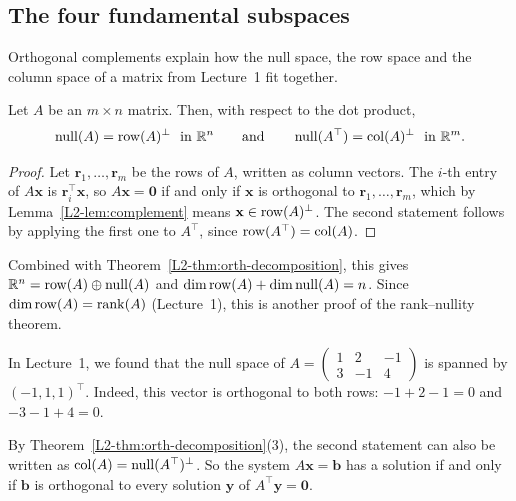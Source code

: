 \subsection{The four fundamental subspaces}

Orthogonal complements explain how the null space, the row space and the column space of a matrix from Lecture~1 fit together.

\begin{theorem}\label{L2-thm:fundamental-subspaces}
    Let $A$ be an $m \times n$ matrix. Then, with respect to the dot product,
    \[\Null(A) = \row(A)^\perp \ \text{ in } \mathbb{R}^n \qquad \text{and} \qquad \Null(A^\top) = \col(A)^\perp \ \text{ in } \mathbb{R}^m.\]
\end{theorem}

\begin{proof}
    Let $\mathbf{r}_1, \ldots, \mathbf{r}_m$ be the rows of $A$, written as column vectors. The $i$-th entry of $A\mathbf{x}$ is $\mathbf{r}_i^\top \mathbf{x}$, so $A\mathbf{x} = \mathbf{0}$ if and only if $\mathbf{x}$ is orthogonal to $\mathbf{r}_1, \ldots, \mathbf{r}_m$, which by Lemma~\ref{L2-lem:complement} means $\mathbf{x} \in \operatorname{row}(A)^\perp$. The second statement follows by applying the first one to $A^\top$, since $\operatorname{row}(A^\top) = \operatorname{col}(A)$.
\end{proof}

Combined with Theorem~\ref{L2-thm:orth-decomposition}, this gives $\mathbb{R}^n = \operatorname{row}(A) \oplus \operatorname{null}(A)$ and $\dim \operatorname{row}(A) + \dim \operatorname{null}(A) = n$. Since $\dim \operatorname{row}(A) = \operatorname{rank}(A)$ (Lecture~1), this is another proof of the rank--nullity theorem.

\begin{example}
    In Lecture~1, we found that the null space of $A = \begin{pmatrix} 1 & 2 & -1 \\ 3 & -1 & 4 \end{pmatrix}$ is spanned by $(-1, 1, 1)^\top$. Indeed, this vector is orthogonal to both rows: $-1 + 2 - 1 = 0$ and $-3 - 1 + 4 = 0$.
\end{example}

\begin{remark}
    By Theorem~\ref{L2-thm:orth-decomposition}(3), the second statement can also be written as $\operatorname{col}(A) = \operatorname{null}(A^\top)^\perp$. So the system $A\mathbf{x} = \mathbf{b}$ has a solution if and only if $\mathbf{b}$ is orthogonal to every solution $\mathbf{y}$ of $A^\top \mathbf{y} = \mathbf{0}$.
\end{remark}

